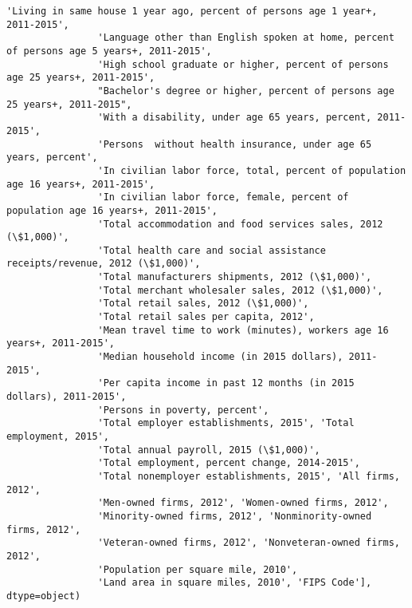 \documentclass[11pt]{article}
\begin{document}
\begin{Verbatim}[commandchars=\\\{\}]
                'Living in same house 1 year ago, percent of persons age 1 year+, 2011-2015',
                'Language other than English spoken at home, percent of persons age 5 years+, 2011-2015',
                'High school graduate or higher, percent of persons age 25 years+, 2011-2015',
                "Bachelor's degree or higher, percent of persons age 25 years+, 2011-2015",
                'With a disability, under age 65 years, percent, 2011-2015',
                'Persons  without health insurance, under age 65 years, percent',
                'In civilian labor force, total, percent of population age 16 years+, 2011-2015',
                'In civilian labor force, female, percent of population age 16 years+, 2011-2015',
                'Total accommodation and food services sales, 2012 (\$1,000)',
                'Total health care and social assistance receipts/revenue, 2012 (\$1,000)',
                'Total manufacturers shipments, 2012 (\$1,000)',
                'Total merchant wholesaler sales, 2012 (\$1,000)',
                'Total retail sales, 2012 (\$1,000)',
                'Total retail sales per capita, 2012',
                'Mean travel time to work (minutes), workers age 16 years+, 2011-2015',
                'Median household income (in 2015 dollars), 2011-2015',
                'Per capita income in past 12 months (in 2015 dollars), 2011-2015',
                'Persons in poverty, percent',
                'Total employer establishments, 2015', 'Total employment, 2015',
                'Total annual payroll, 2015 (\$1,000)',
                'Total employment, percent change, 2014-2015',
                'Total nonemployer establishments, 2015', 'All firms, 2012',
                'Men-owned firms, 2012', 'Women-owned firms, 2012',
                'Minority-owned firms, 2012', 'Nonminority-owned firms, 2012',
                'Veteran-owned firms, 2012', 'Nonveteran-owned firms, 2012',
                'Population per square mile, 2010',
                'Land area in square miles, 2010', 'FIPS Code'], dtype=object)
\end{Verbatim}
            
\end{document}
